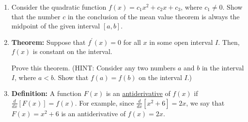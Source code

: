 \documentclass[12pt]{article}
\newif\ifans
\begin{document}
\begin{enumerate}
\item Consider the quadratic function $f(x)=c_1x^2+c_2x+c_3$, where $c_1 \neq 0$.  Show that the number $c$ in the conclusion of the mean value theorem is always the midpoint of the given interval $[a,b]$.

\ifans{\fbox{\parbox{1\linewidth}{Since $f(x)$ is a polynomial, it is continuous and differentiable everywhere on $(-\infty,\infty)$.  In particular, it is continuous on $[a,b]$ and differentiable on $(a,b)$.  Thus, there is a $c$ in $(a,b)$ such that $f^{\prime}(c)=\frac{f(b)-f(a)}{b-a}$.

Notice that:
\begin{align*}
\frac{f(b)-f(a)}{b-a}&=\frac{(c_1b^2+c_2b+c_3)-(c_1a^2+c_2a+c_3)}{b-a}\\
&=\frac{c_1(b^2-a^2)+c_2(b-a)}{b-a}\\
&=c_1(b+a)+c_2
\end{align*}

Finally, notice that $f^{\prime}(x)=2c_1x+c_2$.  Setting this equal to $c_1(b+a)+c_2$ and solving for $x$ yields $x=\frac{b+a}{2}$.  Thus, the value of $c$ in the conclusion of the MVT is $c=\frac{b+a}{2}$, which is the midpoint of the interval $[a,b]$}}}\fi

\item {\bf Theorem:} Suppose that $f^{\prime}(x)=0$ for all $x$ in some open interval $I$.  Then, $f(x)$ is constant on the interval.

Prove this theorem. (HINT: Consider any two numbers $a$ and $b$ in the interval $I$, where $a<b$.  Show that $f(a)=f(b)$ on the interval $I$.)

\ifans{\fbox{\parbox{1\linewidth}{Pick any two numbers $a$ and $b$ in the interval $I$, where $a<b$.  Since, by assumption,  $f(x)$ is differentiable for all $x$ in $I$, we have the following:
\begin{itemize}
\item $f(x)$ is continuous on $[a,b]$
\item $f(x)$ is differentiable on $(a,b)$
\end{itemize}
Therefore, by the Mean Value Theorem, there exists a number $c$ in $(a,b)$ such that $$f^{\prime}(c)=\frac{f(b)-f(a)}{b-a}$$  But, $f^{\prime}(x)=0$ for all x in the interval $I$; so, in particular, $f^{\prime}(c)=0$.  Thus, it follows that $f(b)-f(a)=0 \implies f(b)=f(a)$.  In other words, $f(x)$ is constant on the interval $I$.}}} \fi

\item {\bf Definition:} A function $F(x)$ is an \underline{antiderivative} of $f(x)$ if $\frac{d}{dx}\left[F(x)\right]=f(x)$.  For example, since $\frac{d}{dx}\left[x^2+6\right]=2x$, we say that $F(x)=x^2+6$ is an antiderivative of $f(x)=2x$.


\end{enumerate}
\end{document}
